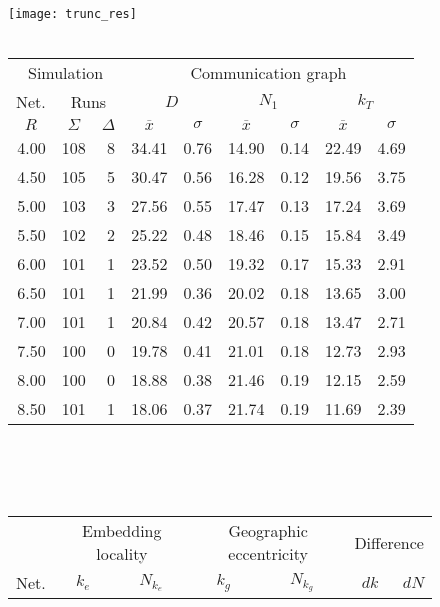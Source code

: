 \documentclass{article}
\begin{document}
\begin{figure}[h]
\begin{center}
\texttt{[image: trunc\_res]}
~\\~\\
\begin{tabular}{|r|rr|rr|rr|rr|}
\hline
\multicolumn{3}{|c|}{Simulation} & \multicolumn{6}{|c|}{Communication graph}\\
\multicolumn{1}{|c}{Net.} & \multicolumn{2}{c|}{Runs} & \multicolumn{2}{|c}{$D$} & \multicolumn{2}{c}{$N_1$} & \multicolumn{2}{c|}{$k_T$}\\
\hline
\multicolumn{1}{|c|}{$R$} & \multicolumn{1}{|c}{$\Sigma$} & \multicolumn{1}{c|}{$\Delta$} & \multicolumn{1}{|c}{$\overline{x}$} & \multicolumn{1}{c|}{$\sigma$} & \multicolumn{1}{|c}{$\overline{x}$} & \multicolumn{1}{c|}{$\sigma$} & \multicolumn{1}{|c}{$\overline{x}$} & \multicolumn{1}{c|}{$\sigma$}\\
4.00 & 108 & 8 & 34.41 & 0.76 & 14.90 & 0.14 & 22.49 & 4.69\\
4.50 & 105 & 5 & 30.47 & 0.56 & 16.28 & 0.12 & 19.56 & 3.75\\
5.00 & 103 & 3 & 27.56 & 0.55 & 17.47 & 0.13 & 17.24 & 3.69\\
5.50 & 102 & 2 & 25.22 & 0.48 & 18.46 & 0.15 & 15.84 & 3.49\\
6.00 & 101 & 1 & 23.52 & 0.50 & 19.32 & 0.17 & 15.33 & 2.91\\
6.50 & 101 & 1 & 21.99 & 0.36 & 20.02 & 0.18 & 13.65 & 3.00\\
7.00 & 101 & 1 & 20.84 & 0.42 & 20.57 & 0.18 & 13.47 & 2.71\\
7.50 & 100 & 0 & 19.78 & 0.41 & 21.01 & 0.18 & 12.73 & 2.93\\
8.00 & 100 & 0 & 18.88 & 0.38 & 21.46 & 0.19 & 12.15 & 2.59\\
8.50 & 101 & 1 & 18.06 & 0.37 & 21.74 & 0.19 & 11.69 & 2.39\\
\hline
\end{tabular}\\
~\\~\\
\begin{tabular}{|r|rr|rr|rr|rr|rr|}
\hline
& \multicolumn{4}{|c|}{Embedding locality} & \multicolumn{4}{|c|}{Geographic eccentricity} & \multicolumn{2}{|c|}{Difference}\\
Net. & \multicolumn{2}{c}{$k_e$} & \multicolumn{2}{c|}{$N_{k_e}$} & \multicolumn{2}{c}{$k_g$} & \multicolumn{2}{c|}{$N_{k_g}$}& $dk$ & $dN$\\

\end{tabular}
\end{center}
\end{figure}
\end{document}
